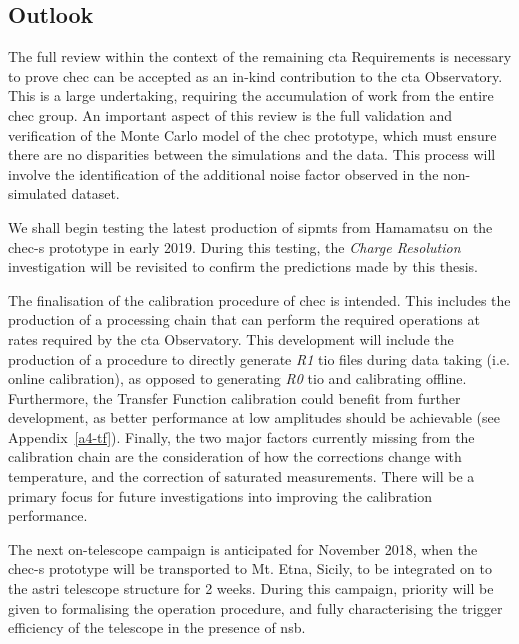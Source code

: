 \subsection{Outlook}
 
The full review within the context of the remaining \gls{cta} Requirements is necessary to prove \gls{chec} can be accepted as an in-kind contribution to the \gls{cta} Observatory. This is a large undertaking, requiring the accumulation of work from the entire \gls{chec} group. An important aspect of this review is the full validation and verification of the Monte Carlo model of the \gls{chec} prototype, which must ensure there are no disparities between the simulations and the data. This process will involve the identification of the additional noise factor observed in the non-simulated dataset.

We shall begin testing the latest production of \glspl{sipmt} from Hamamatsu on the \gls{chec-s} prototype in early 2019. During this testing, the \textit{Charge Resolution} investigation will be revisited to confirm the predictions made by this thesis.

The finalisation of the calibration procedure of \gls{chec} is intended. This includes the production of a processing chain that can perform the required operations at rates required by the \gls{cta} Observatory. This development will include the production of a procedure to directly generate \textit{R1} \gls{tio} files during data taking (i.e. online calibration), as opposed to generating \textit{R0} \gls{tio} and calibrating offline. Furthermore, the Transfer Function calibration could benefit from further development, as better performance at low amplitudes should be achievable (see Appendix~\ref{a4-tf}). Finally, the two major factors currently missing from the calibration chain are the consideration of how the corrections change with temperature, and the correction of saturated measurements. There will be a primary focus for future investigations into improving the calibration performance.

The next on-telescope campaign is anticipated for November 2018, when the \gls{chec-s} prototype will be transported to Mt. Etna, Sicily, to be integrated on to the \gls{astri} telescope structure for 2 weeks. During this campaign, priority will be given to formalising the operation procedure, and fully characterising the trigger efficiency of the telescope in the presence of \gls{nsb}.